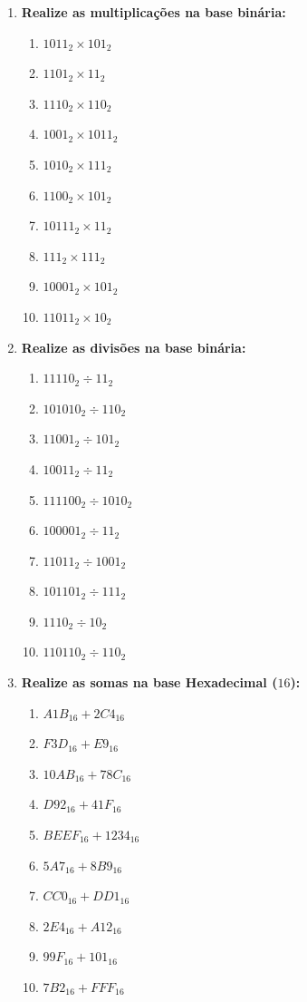 \begin{enumerate}
    \item \textbf{Realize as multiplicações na base binária:}
          \begin{enumerate}
              \item $1011_{2} \times 101_{2}$
              \item $1101_{2} \times 11_{2}$
              \item $1110_{2} \times 110_{2}$
              \item $1001_{2} \times 1011_{2}$
              \item $1010_{2} \times 111_{2}$
              \item $1100_{2} \times 101_{2}$
              \item $10111_{2} \times 11_{2}$
              \item $111_{2} \times 111_{2}$
              \item $10001_{2} \times 101_{2}$
              \item $11011_{2} \times 10_{2}$
          \end{enumerate}

    \item \textbf{Realize as divisões na base binária:}
          \begin{enumerate}
              \item $11110_{2} \div 11_{2}$
              \item $101010_{2} \div 110_{2}$
              \item $11001_{2} \div 101_{2}$
              \item $10011_{2} \div 11_{2}$
              \item $111100_{2} \div 1010_{2}$
              \item $100001_{2} \div 11_{2}$
              \item $11011_{2} \div 1001_{2}$
              \item $101101_{2} \div 111_{2}$
              \item $1110_{2} \div 10_{2}$
              \item $110110_{2} \div 110_{2}$
          \end{enumerate}

    \item \textbf{Realize as somas na base Hexadecimal ($16$):}
          \begin{enumerate}
              \item $A1B_{16} + 2C4_{16}$
              \item $F3D_{16} + E9_{16}$
              \item $10AB_{16} + 78C_{16}$
              \item $D92_{16} + 41F_{16}$
              \item $BEEF_{16} + 1234_{16}$
              \item $5A7_{16} + 8B9_{16}$
              \item $CC0_{16} + DD1_{16}$
              \item $2E4_{16} + A12_{16}$
              \item $99F_{16} + 101_{16}$
              \item $7B2_{16} + FFF_{16}$
          \end{enumerate}


\end{enumerate}
